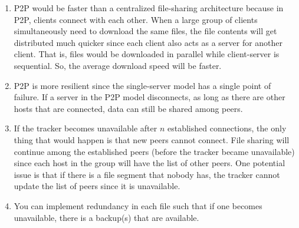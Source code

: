 \documentclass{report}
\begin{document}
\begin{problem}
\begin{answer}{40em}
  \begin{enumerate}[label=(\alph*)]
  \item P2P would be faster than a centralized file-sharing architecture because in P2P,
    clients connect with each other. When a large group of clients simultaneously need to download the
    same files, the file contents will get distributed much quicker since each client also acts as a
    server for another client. That is, files would be downloaded in parallel while client-server is
    sequential. So, the average download speed will be faster.
  \item P2P is more resilient since the single-server model has a single point of failure. If a
    server in the P2P model disconnects, as long as there are other hosts that are connected, data
    can still be shared among peers.
  \item If the tracker becomes unavailable after $n$ established connections, the only thing that
    would happen is that new peers cannot connect. File sharing will continue among the established
    peers (before the tracker became unavailable) since each host in the group will have the list of
    other peers. One potential issue is that if there is a file segment that nobody has, the
    tracker cannot update the list of peers since it is unavailable.
  \item You can implement redundancy in each file such that if one becomes unavailable, there is a
    backup(s) that are available.
  \end{enumerate}

\end{answer}
\end{problem}

\newpage
\end{document}
